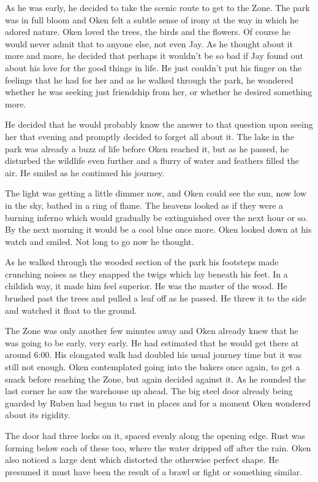 As he was early, he decided to take the scenic route to get to the Zone.  The park was in full bloom and Oken felt a subtle sense of irony at the way in which he adored nature.  Oken loved the trees, the birds and the flowers.  Of course he would never admit that to anyone else, not even Jay.  As he thought about it more and more, he decided that perhaps it wouldn't be so bad if Jay found out about his love for the good things in life.  He just couldn't put his finger on the feelings that he had for her and as he walked through the park, he wondered whether he was seeking just friendship from her, or whether he desired something more.

He decided that he would probably know the answer to that question upon seeing her that evening and promptly decided to forget all about it.  The lake in the park was already a buzz of life before Oken reached it, but as he passed, he disturbed the wildlife even further and a flurry of water and feathers filled the air.  He smiled as he continued his journey.

The light was getting a little dimmer now, and Oken could see the sun, now low in the sky, bathed in a ring of flame.  The heavens looked as if they were a burning inferno which would gradually be extinguished over the next hour or so.  By the next morning it would be a cool blue once more.  Oken looked down at his watch and smiled.  Not long to go now he thought.

As he walked through the wooded section of the park his footsteps made crunching noises as they snapped the twigs which lay beneath his feet.  In a childish way, it made him feel superior.  He was the master of the wood.  He brushed past the trees and pulled a leaf off as he passed.  He threw it to the side and watched it float to the ground.  

The Zone was only another few minutes away and Oken already knew that he was going to be early, very early.  He had estimated that he would get there at around 6:00.  His elongated walk had doubled his usual journey time but it was still not enough.  Oken contemplated going into the bakers once again, to get a snack before reaching the Zone, but again decided against it.  As he rounded the last corner he saw the warehouse up ahead.  The big steel door already being guarded by Ruben had begun to rust in places and for a moment Oken wondered about its rigidity.  

The door had three locks on it, spaced evenly along the opening edge.  Rust was forming below each of these too, where the water dripped off after the rain.  Oken also noticed a large dent which distorted the otherwise perfect shape.  He presumed it must have been the result of a brawl or fight or something similar.

